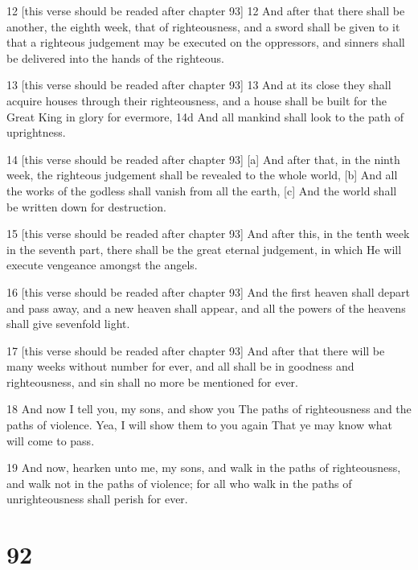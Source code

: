 \par 12 [this verse should be readed after chapter 93] 12 And after that there shall be another, the eighth week, that of righteousness, and a sword shall be given to it that a righteous judgement may be executed on the oppressors, and sinners shall be delivered into the hands of the righteous.
\par 13 [this verse should be readed after chapter 93] 13 And at its close they shall acquire houses through their righteousness, and a house shall be built for the Great King in glory for evermore, 14d And all mankind shall look to the path of uprightness.
\par 14 [this verse should be readed after chapter 93] [a] And after that, in the ninth week, the righteous judgement shall be revealed to the whole world, [b] And all the works of the godless shall vanish from all the earth, [c] And the world shall be written down for destruction.
\par 15 [this verse should be readed after chapter 93] And after this, in the tenth week in the seventh part, there shall be the great eternal judgement, in which He will execute vengeance amongst the angels.
\par 16 [this verse should be readed after chapter 93] And the first heaven shall depart and pass away, and a new heaven shall appear, and all the powers of the heavens shall give sevenfold light.
\par 17 [this verse should be readed after chapter 93] And after that there will be many weeks without number for ever, and all shall be in goodness and righteousness, and sin shall no more be mentioned for ever.
\par 18 And now I tell you, my sons, and show you The paths of righteousness and the paths of violence. Yea, I will show them to you again That ye may know what will come to pass.
\par 19 And now, hearken unto me, my sons, and walk in the paths of righteousness, and walk not in the paths of violence; for all who walk in the paths of unrighteousness shall perish for ever.

\chapter{92}

